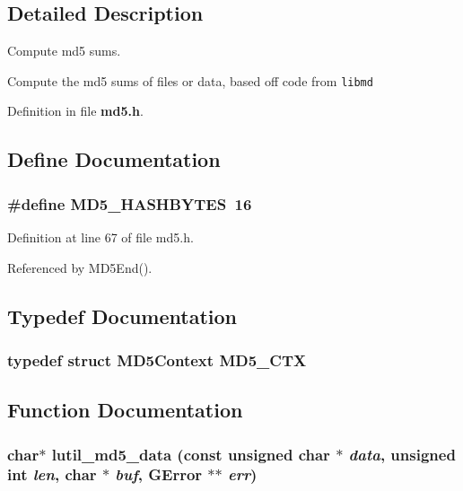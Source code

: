 \subsection{Detailed Description}
Compute md5 sums. 

Compute the md5 sums of files or data, based off code from {\tt libmd}

Definition in file {\bf md5.h}.

\subsection{Define Documentation}
\subsubsection{\setlength{\rightskip}{0pt plus 5cm}\#define MD5\_\-HASHBYTES\ 16}\label{md5_8h_a0}




Definition at line 67 of file md5.h.

Referenced by MD5End().

\subsection{Typedef Documentation}
\subsubsection{\setlength{\rightskip}{0pt plus 5cm}typedef struct {\bf MD5Context}  {\bf MD5\_\-CTX}}\label{md5_8h_a1}




\subsection{Function Documentation}
\subsubsection{\setlength{\rightskip}{0pt plus 5cm}char$\ast$ lutil\_\-md5\_\-data (const unsigned char $\ast$ {\em data}, unsigned int {\em len}, char $\ast$ {\em buf}, GError $\ast$$\ast$ {\em err})}\label{md5_8h_a3}


